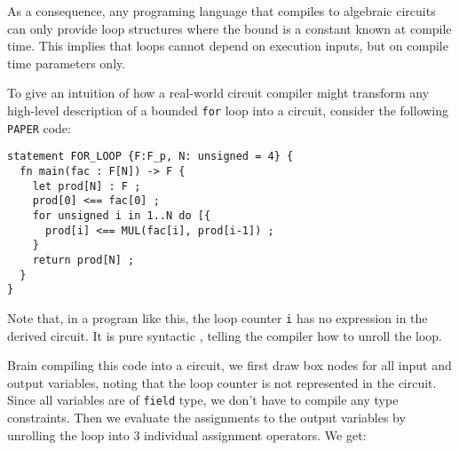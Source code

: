 As a consequence, any programing language that compiles to algebraic circuits can only provide loop structures where the bound is a constant known at compile time. This implies that loops cannot depend on execution inputs, but on compile time parameters only.  
\begin{example} To give an intuition of how a real-world circuit compiler might transform any high-level description of a bounded \texttt{for} loop into a circuit, consider the following \texttt{PAPER} code:
\begin{lstlisting}
statement FOR_LOOP {F:F_p, N: unsigned = 4} {
  fn main(fac : F[N]) -> F {
  	let prod[N] : F ;
  	prod[0] <== fac[0] ;
    for unsigned i in 1..N do [{
      prod[i] <== MUL(fac[i], prod[i-1]) ; 
    }
    return prod[N] ;
  }
}
\end{lstlisting}
Note that, in a program like this, the loop counter \texttt{i} has no expression in the derived circuit. It is pure syntactic , telling the compiler how to unroll the loop.

Brain compiling this code into a circuit, we first draw box nodes for all input and output variables, noting that the loop counter is not represented in the circuit. Since all variables are of \texttt{field} type, we don't have to compile any type constraints. Then we evaluate the assignments to the output variables by unrolling the loop into $3$ individual assignment operators. We get:
\begin{center}
\end{center}
\end{example}
